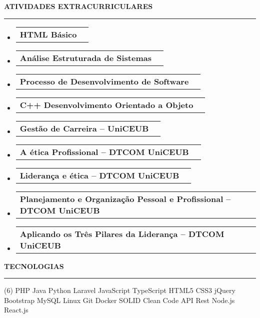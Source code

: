 \documentclass[a4paper,10pt]{article}
\makeatletter
\newcommand{\ProjectItem}[2]{
    \item
        \begin{tabular*}{0.93\textwidth}[t]{l@{\extracolsep{\fill}}r}
            \textbf{#1} & \footnotesize#2
        \end{tabular*}
}
\newcommand{\SectionTitle}[1]{
    \begin{flushleft}
    \textbf{#1}
    \noindent\textcolor{gray}{\rule{18.5cm}{1px}}
    \end{flushleft}
}
\newcommand{\SectionBegin}[0]{
    \vspace{-16pt}\begin{flushleft}
    \begin{itemize}
}
\newcommand{\SectionEnd}[0]{
    \end{itemize}
    \end{flushleft}\vspace{-2pt}
}
\makeatother
\begin{document}
\SectionTitle
    {ATIVIDADES EXTRACURRICULARES}
\SectionBegin
    \ProjectItem{HTML Básico}{}
    \ProjectItem{Análise Estruturada de Sistemas}{}
    \ProjectItem{Processo de Desenvolvimento de Software}{}
    \ProjectItem{C++ Desenvolvimento Orientado a Objeto}{}
    \ProjectItem{Gestão de Carreira – UniCEUB}{}
    \ProjectItem{A ética Profissional – DTCOM UniCEUB}{}
    \ProjectItem{Liderança e ética – DTCOM UniCEUB}{}
    \ProjectItem{Planejamento e Organização Pessoal e Profissional – DTCOM UniCEUB}{}
    \ProjectItem{Aplicando os Três Pilares da Liderança – DTCOM UniCEUB}{}
\SectionEnd
    
\SectionTitle
    {TECNOLOGIAS}
\begin{tasks}[style=itemize, column-sep=-13mm, label-align=left, label-offset={0mm}](6)%
\task PHP
\task Java
\task Python
\task Laravel
\task JavaScript
\task TypeScript
\task HTML5
\task CSS3
\task jQuery
\task Bootstrap
\task MySQL
\task Linux
\task Git
\task Docker
\task SOLID
\task Clean Code
\task API Rest
\task Node.js
\task React.js
\end{tasks}
\end{document}
